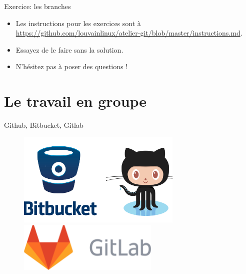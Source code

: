 \documentclass{beamer}
\begin{document}
\begin{frame}{Exercice: les branches}

    \begin{itemize}
        \item Les instructions pour les exercices sont à
        \url{https://github.com/louvainlinux/atelier-git/blob/master/instructions.md}.
    \item Essayez de le faire sans la solution.
    \item N'hésitez pas à poser des questions !
    \end{itemize}
\end{frame}

\section{Le travail en groupe}

\begin{frame}{Github, Bitbucket, Gitlab}
\begin{figure}
    \centering
    \includegraphics[width=0.7\textwidth]{img/github-bitbucket.png} \\
    \includegraphics[width=0.6\textwidth]{img/gitlab.png}
\end{figure}
\end{frame}
\end{document}
